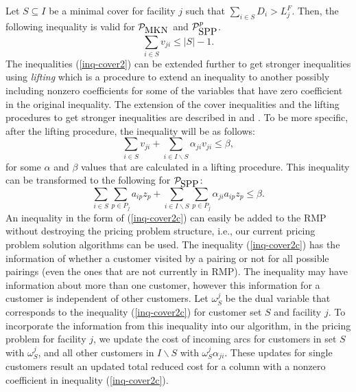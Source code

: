 Let $S \subseteq I$ be a minimal cover for facility $j$ such that
$\sum_{i \in S}D_i> L^F_j$. Then, the following inequality is valid
for $\mathcal{P}_{\mbox{MKN}}$ and $\mathcal{P}^p_{\mbox{SPP}}$.
\begin{equation}
\sum_{i \in S}v_{ji} \leq |S|-1. \label{inq-cover2}
\end{equation}
The inequalities (\ref{inq-cover2}) can be extended further to get
stronger inequalities using {\em lifting} which is a procedure to extend an
inequality to another possibly including nonzero coefficients for
some of the variables that have zero coefficient in the original
inequality. %
The extension of the cover inequalities and the lifting procedures
to get stronger inequalities are described in \citet{Nemhauser} and \citet{Gu}.
To be more specific, after the lifting procedure, the inequality will be
as follows:
\begin{equation}
\sum_{i \in S}v_{ji} + \sum_{i \in I\backslash S}\alpha_{ji}v_{ji}
\leq \beta, \label{inq-cover2b}
\end{equation}
for some $\alpha$ and $\beta$ values that are calculated in a
lifting procedure. This inequality can be transformed to the following
for $\mathcal{P}_{\mbox{SPP}}$:
\begin{equation}
\sum_{i \in S}\sum_{p \in P_j}a_{ip}z_{p} + \sum_{i \in I\backslash
S}\sum_{p \in P_j}\alpha_{ji}a_{ip}z_{p} \leq \beta.
\label{inq-cover2c}
\end{equation}
An inequality in the form of (\ref{inq-cover2c}) can easily be added
to the RMP without destroying the pricing problem structure, i.e.,
our current pricing problem solution algorithms can be used. The
inequality (\ref{inq-cover2c}) has the information of whether a
customer visited by a pairing or not for all possible pairings (even
the ones that are not currently in RMP). The inequality may have
information about more than one customer, however this information
for a customer is independent of other customers.
Let $\omega_S^j$ be the dual variable that corresponds to the
inequality (\ref{inq-cover2c}) for customer set $S$ and facility
$j$. To incorporate the information from this inequality into our
algorithm, in the pricing problem for facility $j$, we update the
cost of incoming arcs for customers in set $S$  with $\omega_S^j$,
and all other customers in $I\backslash S$ with $\omega_S^j
\alpha_{ji}$. These updates for single customers result an updated
total reduced cost for a column with a nonzero coefficient
in inequality (\ref{inq-cover2c}).

